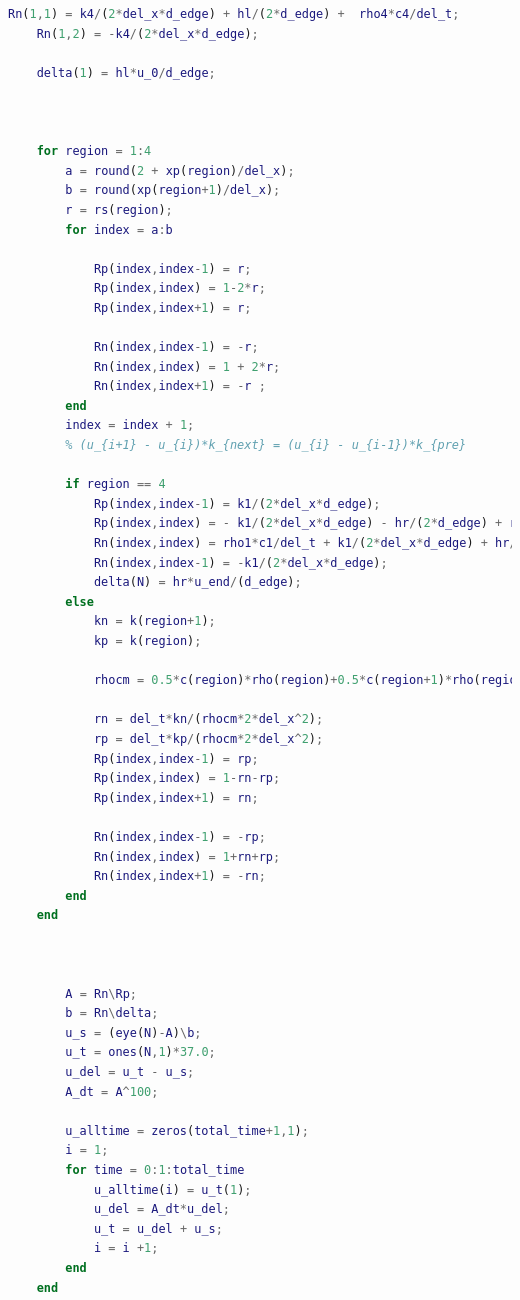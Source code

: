 \documentclass{cumcmthesis}
\begin{document}
\begin{appendices}
\begin{lstlisting}[language=matlab]
    Rn(1,1) = k4/(2*del_x*d_edge) + hl/(2*d_edge) +  rho4*c4/del_t;
    Rn(1,2) = -k4/(2*del_x*d_edge);
    
    delta(1) = hl*u_0/d_edge;
    
    
    
    for region = 1:4
        a = round(2 + xp(region)/del_x);
        b = round(xp(region+1)/del_x);
        r = rs(region);
        for index = a:b
    
            Rp(index,index-1) = r;   
            Rp(index,index) = 1-2*r;
            Rp(index,index+1) = r;
        
            Rn(index,index-1) = -r;
            Rn(index,index) = 1 + 2*r;
            Rn(index,index+1) = -r ;
        end
        index = index + 1;
        % (u_{i+1} - u_{i})*k_{next} = (u_{i} - u_{i-1})*k_{pre}
        
        if region == 4
            Rp(index,index-1) = k1/(2*del_x*d_edge);
            Rp(index,index) = - k1/(2*del_x*d_edge) - hr/(2*d_edge) + rho1*c1/del_t;
            Rn(index,index) = rho1*c1/del_t + k1/(2*del_x*d_edge) + hr/(2*d_edge);
            Rn(index,index-1) = -k1/(2*del_x*d_edge);
            delta(N) = hr*u_end/(d_edge);
        else
            kn = k(region+1);
            kp = k(region);
    
            rhocm = 0.5*c(region)*rho(region)+0.5*c(region+1)*rho(region+1);
            
            rn = del_t*kn/(rhocm*2*del_x^2);
            rp = del_t*kp/(rhocm*2*del_x^2);
            Rp(index,index-1) = rp;   
            Rp(index,index) = 1-rn-rp;
            Rp(index,index+1) = rn;
    
            Rn(index,index-1) = -rp;
            Rn(index,index) = 1+rn+rp;
            Rn(index,index+1) = -rn;
        end
    end
    
    
    
        A = Rn\Rp;
        b = Rn\delta;
        u_s = (eye(N)-A)\b;
        u_t = ones(N,1)*37.0;
        u_del = u_t - u_s;
        A_dt = A^100;
        
        u_alltime = zeros(total_time+1,1);
        i = 1;
        for time = 0:1:total_time
            u_alltime(i) = u_t(1);
            u_del = A_dt*u_del;
            u_t = u_del + u_s;
            i = i +1;
        end
    end
\end{lstlisting}

\end{appendices}
\end{document}
